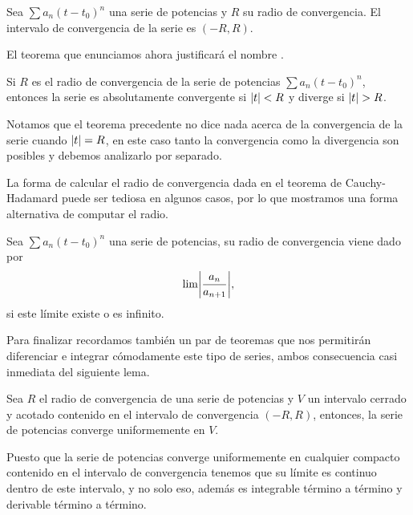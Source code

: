 \documentclass[../ecuaciones_diferenciales.tex]{subfiles}
\begin{document}
\begin{definition}
	Sea \(\sum a_n (t - t_0)^n\) una serie de potencias y \(R\) su radio de
	convergencia. El intervalo de convergencia de la serie es \((-R, R)\).
\end{definition}

El teorema que enunciamos ahora justificará el nombre .

\begin{theorem}
	Si \(R\) es el radio de convergencia de la serie de potencias 
	\(\sum a_n (t - t_0)^n\), entonces la serie es absolutamente convergente si 
	\(\abs{t} < R\) y diverge si \(\abs{t} > R\).
\end{theorem}

\begin{remark}
	Notamos que el teorema precedente no dice nada acerca de la convergencia de
	la serie cuando \(\abs{t} = R\), en este caso tanto la convergencia como la
	divergencia son posibles y debemos analizarlo por separado.
\end{remark}

La forma de calcular el radio de convergencia dada en el teorema de
Cauchy-Hadamard puede ser tediosa en algunos casos, por lo que mostramos una
forma alternativa de computar el radio.

\begin{lemma}
	Sea \(\sum a_n (t - t_0)^n\) una serie de potencias, su radio de
	convergencia viene dado por
	\[\lim\abs{\frac{a_n}{a_{n + 1}}},\]
	si este límite existe o es infinito.
\end{lemma}

Para finalizar recordamos también un par de teoremas que nos permitirán
diferenciar e integrar cómodamente este tipo de series, ambos consecuencia casi
inmediata del siguiente lema.

\begin{lemma}
	Sea \(R\) el radio de convergencia de una serie de potencias y \(V\) un
	intervalo cerrado y acotado contenido en el intervalo de convergencia 
	\((-R, R)\), entonces, la serie de potencias converge uniformemente en
	\(V\).
\end{lemma}

Puesto que la serie de potencias converge uniformemente en cualquier compacto
contenido en el intervalo de convergencia tenemos que su límite es continuo
dentro de este intervalo, y no solo eso, además es integrable término a
término y derivable término a término.
\end{document}

